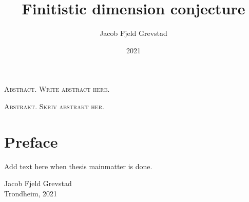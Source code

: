 \documentclass[11pt, english, twoside]{article}
\theoremstyle{definition}
\begin{document}
\title{Finitistic dimension conjecture}
\author{Jacob Fjeld Grevstad}
\date{2021}
{}

%
\noindent \scshape\mdseries Abstract. \normalfont
Write abstract here. \lipsum[1] 

\noindent \scshape\mdseries Abstrakt. \normalfont
Skriv abstrakt her. \lipsum[2] 
\clearpage

\section*{Preface}
%
Add text here when thesis mainmatter is done. 
\begin{flushright}
	Jacob Fjeld Grevstad\\ 
	Trondheim, 2021
\end{flushright}
\clearpage

\tableofcontents
\clearpage



\newpage












%

















\begin{appendices}

\end{appendices}
\end{document}
